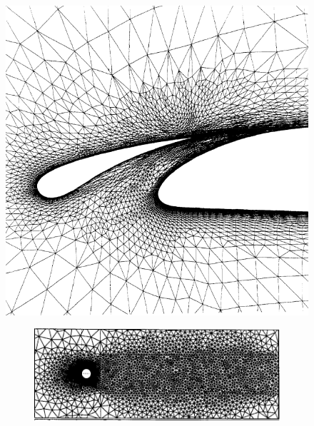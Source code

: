 \begin{figure}
\centering
\begin{minipage}[b]{.4\textwidth}
	\centering
	\includegraphics[width=\linewidth]{img/intro/lit/mavri.png}
	\caption{Illustration of adaptively refined mesh for the two-element airfoil configuration near the gap region \cite{mavriplis1990adaptive}.}
	\label{fig-mavri}
\end{minipage}\hfill
\begin{minipage}[b]{.55\textwidth}
	\centering
	\begin{subfigure}{\linewidth}
	\centering
	\includegraphics[width=\linewidth]{img/intro/lit/castroInitial.png}
	\caption{}
	\label{fig-castroInitial}
	\end{subfigure}
	\begin{subfigure}{\linewidth}
		\centering

\end{subfigure}
\end{minipage}
\end{figure}
